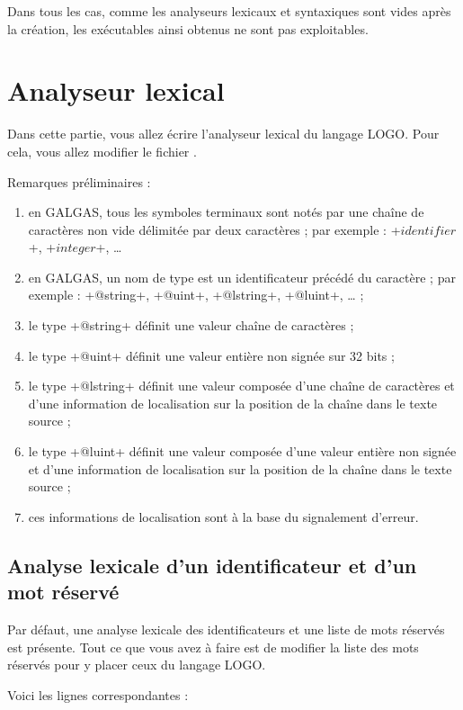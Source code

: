 Dans tous les cas, comme les analyseurs lexicaux et syntaxiques sont vides après la création, les exécutables ainsi obtenus ne sont pas exploitables.


\section {Analyseur lexical}


Dans cette partie, vous allez écrire l’analyseur lexical du langage LOGO. Pour cela, vous allez modifier le fichier .

Remarques préliminaires :
\begin{enumerate}
  \item en GALGAS, tous les symboles terminaux sont notés par une chaîne de caractères non vide délimitée par deux caractères \tpp{\$} ; par exemple : \ggs+$identifier$+, \ggs+$integer$+, … 
  \item en GALGAS, un nom de type est un identificateur précédé du caractère  ; par exemple : \ggs+@string+, \ggs+@uint+, \ggs+@lstring+, \ggs+@luint+, … ;
  \item le type \ggs+@string+ définit une valeur chaîne de caractères ;
  \item le type \ggs+@uint+ définit une valeur entière non signée sur 32 bits ;
  \item le type \ggs+@lstring+ définit une valeur composée d'une chaîne de caractères et d'une information de localisation sur la position de la chaîne dans le texte source ;
  \item le type \ggs+@luint+ définit une valeur composée d'une valeur entière non signée et d'une information de localisation sur la position de la chaîne dans le texte source ;
  \item ces informations de localisation sont à la base du signalement d'erreur.
\end{enumerate}

\subsection{Analyse lexicale d'un identificateur et d'un mot réservé}

Par défaut, une analyse lexicale des identificateurs et une liste de mots réservés est présente. Tout ce que vous avez à faire est de modifier la liste des mots réservés pour y placer ceux du langage LOGO.

Voici les lignes correspondantes :

